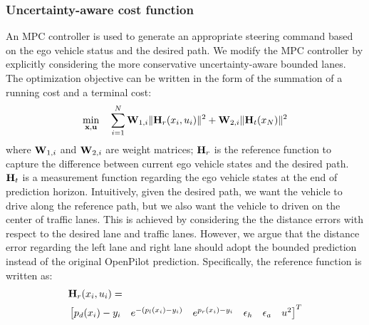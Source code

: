 \subsubsection{Uncertainty-aware cost function}
An MPC controller is used to generate an appropriate steering command based on the ego vehicle status and the desired path. We modify the MPC controller by explicitly considering the more conservative uncertainty-aware bounded lanes. The optimization objective can be written in the form of the summation of a running cost and a terminal cost:
\begin{equation}
    \min_{\bold{x},\bold{u}}\quad \sum_{i = 1}^{N} \bold{W}_{1,i}\| \bold{H}_{r}(x_{i},u_{i})\|^{2} + \bold{W}_{2,i}\|\bold{H}_{t}(x_{N})\|^{2}
\end{equation}
where $\bold{W}_{1,i}$ and $\bold{W}_{2,i}$ are weight matrices; $\bold{H}_{r}$ is the reference function to capture the difference between current ego vehicle states and the desired path. $\bold{H}_{t}$ is a measurement function regarding the ego vehicle states at the end of prediction horizon. Intuitively, given the desired path, we want the vehicle to drive along the reference path, but we also want the vehicle to driven on the center of traffic lanes. This is achieved by considering the the distance errors with respect to the  desired lane and traffic lanes. However, we argue that the distance error regarding the left lane and right lane should adopt the bounded prediction instead of the original OpenPilot prediction. Specifically, the reference function is written as:
\begin{align*}
    &\bold{H}_{r}(x_{i},u_{i}) = \\
    &\begin{bmatrix}
    p_{d}(x_{i})-y_{i}&
    e^{-(p_{l}(x_{i})-y_{i})}&
    e^{p_{r}(x_{i})-y_{i}}&
    \epsilon_{h}&
    \epsilon_{a}&
    u^{2}
    \end{bmatrix}^{T}
\end{align*}
